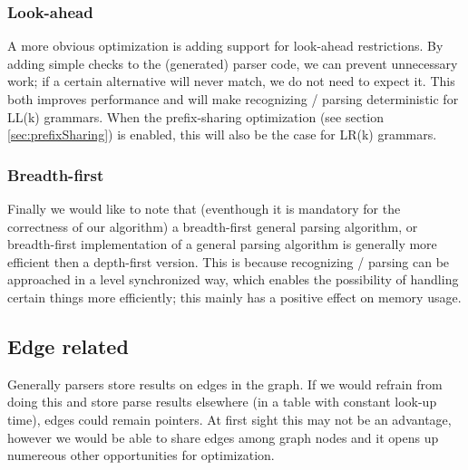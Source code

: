 \documentclass[a4paper,10pt]{article}
\begin{document}
\subsubsection{Look-ahead}
A more obvious optimization is adding support for look-ahead restrictions. By adding simple checks to the (generated) parser code, we can prevent unnecessary work; if a certain alternative will never match, we do not need to expect it. This both improves performance and will make recognizing / parsing deterministic for LL(k) grammars. When the prefix-sharing optimization (see section \ref{sec:prefixSharing}) is enabled, this will also be the case for LR(k) grammars.

\subsubsection{Breadth-first}
Finally we would like to note that (eventhough it is mandatory for the correctness of our algorithm) a breadth-first general parsing algorithm, or breadth-first implementation of a general parsing algorithm is generally more efficient then a depth-first version. This is because recognizing / parsing can be approached in a level synchronized way, which enables the possibility of handling certain things more efficiently; this mainly has a positive effect on memory usage.

\subsection{Edge related}
\label{sec:edgeOptimizations}

Generally parsers store results on edges in the graph. If we would refrain from doing this and store parse results elsewhere (in a table with constant look-up time), edges could remain pointers. At first sight this may not be an advantage, however we would be able to share edges among graph nodes and it opens up numereous other opportunities for optimization.
\end{document}
